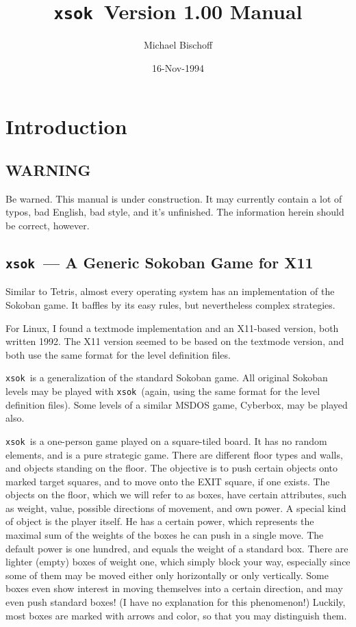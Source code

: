 \newcommand{\xsok}{{\tt xsok}}
\title{\xsok\ Version 1.00 Manual}
\author{Michael Bischoff}
\date{16-Nov-1994}

\maketitle
\tableofcontents

\newpage
\section{Introduction}
\subsection{WARNING}
Be warned. This manual is under construction. It may currently contain a lot of typos,
bad English, bad style, and it's unfinished. The information herein should be correct, however.

\subsection{\xsok\ --- A Generic Sokoban Game for X11}
Similar to Tetris, almost every operating system has an implementation of
the Sokoban game. It baffles by its easy rules, but nevertheless
complex strategies.

For Linux, I found a textmode implementation and an X11-based version, both
written 1992. The X11 version seemed to be based on the textmode version,
and both use the same format for the level definition files.

\xsok\ is a generalization of the standard Sokoban game.
All original Sokoban levels may be played with \xsok\ (again, using the same
format for the level definition files). Some levels of a similar MSDOS game,
Cyberbox, may be played also.

\xsok\ is a one-person game played on a square-tiled board. It has no random
elements, and is a pure strategic game. There are different
floor types and walls, and objects standing on the floor. The objective is
to push certain objects onto marked target squares, and to move onto the EXIT
square, if one exists.
The objects on the floor, which we will refer to as boxes, have certain
attributes,
such as weight, value, possible directions of movement, and own power.
A special kind of object is the player itself. He has a certain power, which
represents the maximal sum of the weights of the boxes he can push in a single
move.
The default power is one hundred, and equals the weight of a standard box.
There are lighter (empty) boxes of weight one, which simply block your way,
especially since some of them may be moved either only horizontally or only
vertically.
Some boxes even show interest in moving themselves into a certain direction,
and may even push standard boxes! (I have no explanation for this phenomenon!)
Luckily, most boxes are marked with arrows and color, so that you may
distinguish them.

